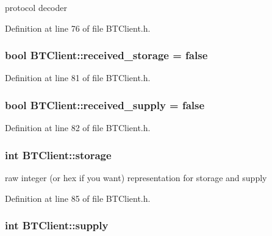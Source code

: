protocol decoder 



Definition at line 76 of file B\-T\-Client.\-h.

\hypertarget{classBTClient_a41a7d3382ab8bbdf4b7d78b7b69ff85f}{
\subsubsection[{received\-\_\-storage}]{\setlength{\rightskip}{0pt plus 5cm}bool B\-T\-Client\-::received\-\_\-storage = false\hspace{0.3cm}{\ttfamily [private]}}}\label{classBTClient_a41a7d3382ab8bbdf4b7d78b7b69ff85f}


Definition at line 81 of file B\-T\-Client.\-h.

\hypertarget{classBTClient_af00b18b695ecc4bdeea133572eb0fd6d}{
\subsubsection[{received\-\_\-supply}]{\setlength{\rightskip}{0pt plus 5cm}bool B\-T\-Client\-::received\-\_\-supply = false\hspace{0.3cm}{\ttfamily [private]}}}\label{classBTClient_af00b18b695ecc4bdeea133572eb0fd6d}


Definition at line 82 of file B\-T\-Client.\-h.

\hypertarget{classBTClient_a5ba419e7e6be73f5ec26f6b6c8d4ccf1}{
\subsubsection[{storage}]{\setlength{\rightskip}{0pt plus 5cm}int B\-T\-Client\-::storage\hspace{0.3cm}{\ttfamily [private]}}}\label{classBTClient_a5ba419e7e6be73f5ec26f6b6c8d4ccf1}


raw integer (or hex if you want) representation for storage and supply 



Definition at line 85 of file B\-T\-Client.\-h.

\hypertarget{classBTClient_a3974a28859432eeef27cfd7391ed7d60}{
\subsubsection[{supply}]{\setlength{\rightskip}{0pt plus 5cm}int B\-T\-Client\-::supply\hspace{0.3cm}{\ttfamily [private]}}}\label{classBTClient_a3974a28859432eeef27cfd7391ed7d60}


